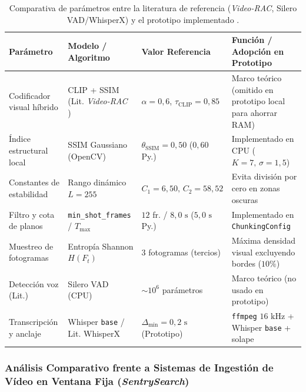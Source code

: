 \begin{table}[htbp]
\centering
\small
\setlength{\tabcolsep}{4.0pt}
\caption{Comparativa de parámetros entre la literatura de referencia (\textit{Video-RAC}, Silero VAD/WhisperX) y el prototipo implementado \cite{video_rac2025, whisperx_silero, mixpeek_chunking, wang2004ssim, radford2023whisper}.} %
\label{tab:parametros_chunking_audio}
\begin{tabularx}{\linewidth}{>{\raggedright\arraybackslash}p{3.4cm} >{\raggedright\arraybackslash}p{3.8cm} >{\raggedright\arraybackslash}p{3.0cm} >{\raggedright\arraybackslash}X}
\toprule
\textbf{Parámetro} & \textbf{Modelo / Algoritmo} & \textbf{Valor Referencia} & \textbf{Función / Adopción en Prototipo} \\
\midrule
Codificador visual híbrido & CLIP + SSIM (Lit. \textit{Video-RAC} \cite{radford2021clip, video_rac2025}) & $\alpha = 0,6$, $\tau_{\text{CLIP}} = 0,85$ & Marco teórico (omitido en prototipo local para ahorrar RAM) \\
Índice estructural local & SSIM Gaussiano \cite{wang2004ssim} (OpenCV) & $\theta_{\text{SSIM}} = 0,50$ ($0,60$ Py.) & Implementado en CPU ($K=7, \, \sigma=1,5$) \\
Constantes de estabilidad & Rango dinámico $L = 255$ & $C_1=6,50, \, C_2=58,52$ & Evita división por cero en zonas oscuras \\
Filtro y cota de planos & \texttt{min\_shot\_frames} / $T_{\max}$ & $12$ fr. / $8,0\text{ s}$ ($5,0\text{ s}$ Py.) & Implementado en \texttt{ChunkingConfig} \\
Muestreo de fotogramas & Entropía Shannon $H(F_t)$ & $3$ fotogramas (tercios) & Máxima densidad visual excluyendo bordes ($10\%$) \\
Detección voz (Lit.) & Silero VAD (CPU) \cite{whisperx_silero} & $\sim 10^6$ parámetros & Marco teórico (no usado en prototipo) \\
Transcripción y anclaje & Whisper \texttt{base} \cite{radford2023whisper} / Lit. WhisperX & $\Delta_{\min} = 0,2\text{ s}$ (Prototipo) & \texttt{ffmpeg} $16\text{ kHz}$ + Whisper \texttt{base} + solape \\
\bottomrule
\end{tabularx}
\end{table}

\subsubsection{Análisis Comparativo frente a Sistemas de Ingestión de Vídeo en Ventana Fija (\textit{SentrySearch})}
\label{subsubsec:comparativa_sentrysearch_videorac}

